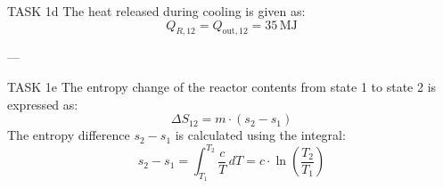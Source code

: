 TASK 1d  
The heat released during cooling is given as:  
\[
Q_{R,12} = Q_{\text{out},12} = 35 \, \text{MJ}
\]

---

TASK 1e  
The entropy change of the reactor contents from state 1 to state 2 is expressed as:  
\[
\Delta S_{12} = m \cdot (s_2 - s_1)
\]  
The entropy difference \( s_2 - s_1 \) is calculated using the integral:  
\[
s_2 - s_1 = \int_{T_1}^{T_2} \frac{c}{T} \, dT = c \cdot \ln \left( \frac{T_2}{T_1} \right)
\]